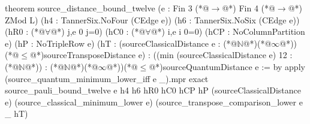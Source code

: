theorem source_distance_bound_twelve
    (e : Fin 3 (*@$\to$@*) Fin 4 (*@$\to$@*) ZMod L)
    (h4 : TannerSix.NoFour (CEdge e)) (h6 : TannerSix.NoSix (CEdge e))
    (hR0 : (*@$\forall$@*) j,e 0 j=0) (hC0 : (*@$\forall$@*) i,e i 0=0)
    (hCP : NoColumnPartition e) (hP : NoTripleRow e)
    (hT : (sourceClassicalDistance e : (*@$\mathbb N$@*)(*@$\infty$@*))(*@$\le$@*)sourceTransposeDistance e) :
    ((min (sourceClassicalDistance e) 12 : (*@$\mathbb N$@*)) : (*@$\mathbb N$@*)(*@$\infty$@*))(*@$\le$@*)sourceQuantumDistance e := by
  apply (source_quantum_minimum_lower_iff e _).mpr
  exact source_pauli_bound_twelve e h4 h6 hR0 hC0 hCP hP (sourceClassicalDistance e)
    (source_classical_minimum_lower e) (source_transpose_comparison_lower e _ hT)
